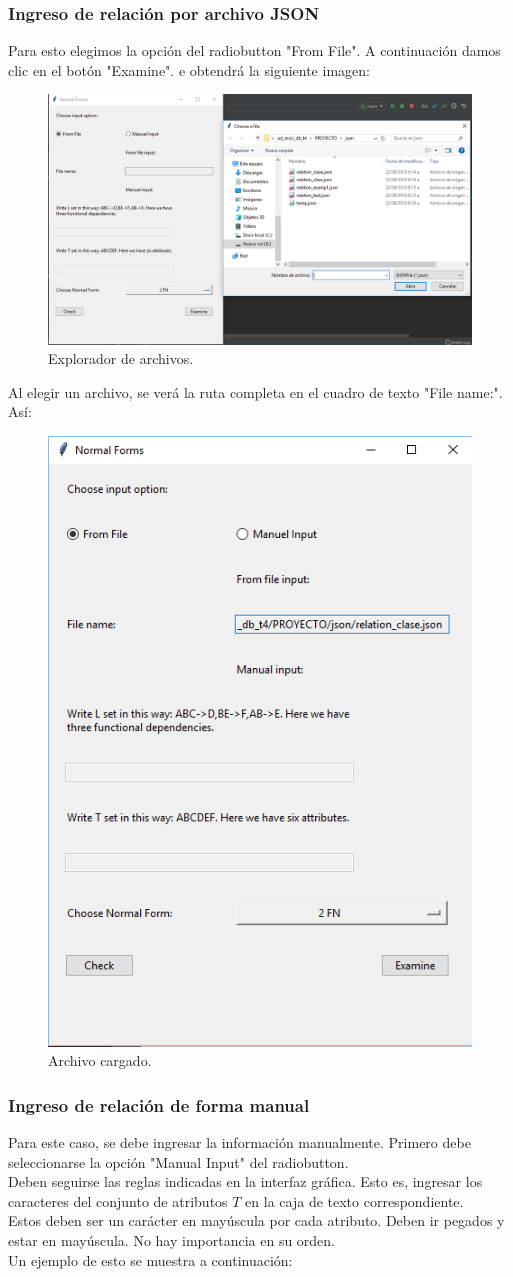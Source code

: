 \documentclass[a4paper,12pt]{article}
\begin{document}
{\subsubsection{Ingreso de relación por archivo JSON}
Para esto elegimos la opción del radiobutton "From File". A continuación damos clic en el botón "Examine". e obtendrá la siguiente imagen:

\begin{figure}[H]
\centering
  \includegraphics[width=0.75\linewidth]{Images/examine_file.png}
  \caption{Explorador de archivos.}
  \label{fig:neurona1}
\end{figure}

Al elegir un archivo, se verá la ruta completa en el cuadro de texto "File name:". Así:

\begin{figure}[H]
\centering
  \includegraphics[width=0.3\linewidth]{Images/file_load.png}
  \caption{Archivo cargado.}
  \label{fig:neurona1}
\end{figure}


\subsubsection{Ingreso de relación de forma manual}

Para este caso, se debe ingresar la información manualmente. Primero debe seleccionarse la opción "Manual Input" del radiobutton.
\\
Deben seguirse las reglas indicadas en la interfaz gráfica. Esto es, ingresar los caracteres del conjunto de atributos $T$ en la caja de texto correspondiente.
\\
Estos deben ser un carácter en mayúscula por cada atributo. Deben ir pegados y estar en mayúscula. No hay importancia en su orden.
\\
Un ejemplo de esto se muestra a continuación:

}
\end{document}
